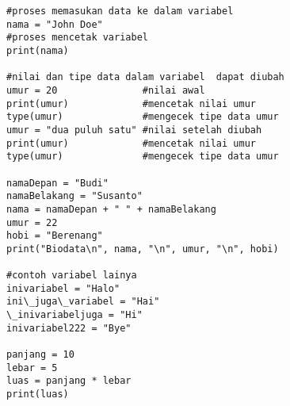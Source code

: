\begin{verbatim}
#proses memasukan data ke dalam variabel
nama = "John Doe"
#proses mencetak variabel
print(nama)

#nilai dan tipe data dalam variabel  dapat diubah
umur = 20               #nilai awal
print(umur)             #mencetak nilai umur
type(umur)              #mengecek tipe data umur
umur = "dua puluh satu" #nilai setelah diubah
print(umur)             #mencetak nilai umur
type(umur)              #mengecek tipe data umur

namaDepan = "Budi"
namaBelakang = "Susanto"
nama = namaDepan + " " + namaBelakang
umur = 22
hobi = "Berenang"
print("Biodata\n", nama, "\n", umur, "\n", hobi)

#contoh variabel lainya
inivariabel = "Halo"
ini\_juga\_variabel = "Hai"
\_inivariabeljuga = "Hi"
inivariabel222 = "Bye" 

panjang = 10
lebar = 5
luas = panjang * lebar
print(luas)
\end{verbatim}

